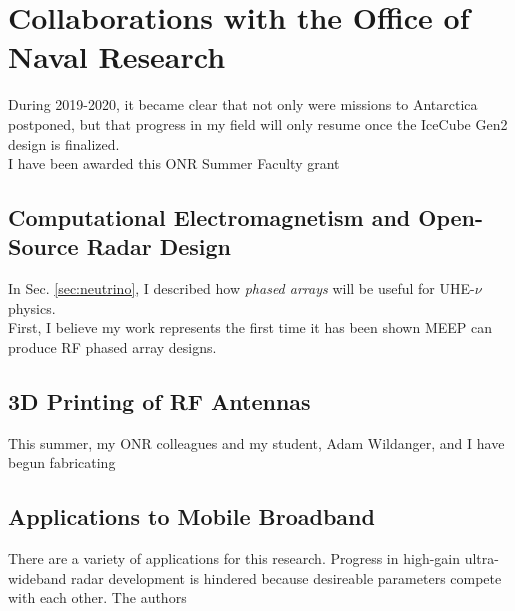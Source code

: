 \documentclass[../../../main.tex]{subfiles}
\begin{document}
\section{Collaborations with the Office of Naval Research}
\label{sec:naval_research}

During 2019-2020, it became clear that not only were missions to Antarctica postponed, but that progress in my field will only resume once the IceCube Gen2 design is finalized.  
\\
\vspace{0.25cm}
I have been awarded this ONR Summer Faculty grant

\subsection{Computational Electromagnetism and Open-Source Radar Design}
\label{sec:phased_array}

In Sec. \ref{sec:neutrino}, I described how \textit{phased arrays} will be useful for UHE-$\nu$ physics.
\\
\vspace{0.25cm}
First, I believe my work represents the first time it has been shown MEEP can produce RF phased array designs.  

\subsection{3D Printing of RF Antennas}
\label{sec:3d_printer}

This summer, my ONR colleagues and my student, Adam Wildanger, and I have begun fabricating

\subsection{Applications to Mobile Broadband}
\label{sec:applications}

There are a variety of applications for this research.  Progress in high-gain ultra-wideband radar development is hindered because desireable parameters compete with each other.  The authors
\end{document}
